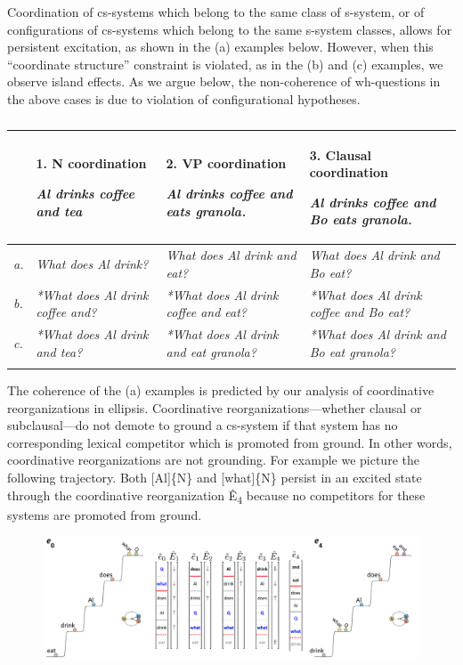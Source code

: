   Coordination of cs-systems which belong to the same class of s-system, or of configurations of cs-systems which belong to the same s-system classes, allows for persistent excitation, as shown in the (a) examples below. However, when this “coordinate structure” constraint is violated, as in the (b) and (c) examples, we observe island effects. As we argue below, the non-coherence of wh-questions in the above cases is due to violation of configurational hypotheses.

\begin{table}
\begin{tabularx}{\textwidth}{lQQQ}
\lsptoprule
& 1. N coordination

\textit{Al drinks coffee and tea} & 2. VP coordination

\textit{Al drinks coffee and eats granola.} & 3. Clausal coordination

\textit{Al drinks coffee and Bo eats granola.}\\
\midrule 

\textit{a.} & \textit{What does Al drink?} & \textit{What does Al drink and eat?} & \textit{What does Al drink and Bo eat?}\\
\textit{b.} & \textit{*What does Al drink coffee and?} & \textit{*What does Al drink coffee and eat?} & \textit{*What does Al drink coffee and Bo eat?}\\
\textit{c.} & \textit{*What does Al drink and tea?} & \textit{*What does Al drink and eat granola?} & \textit{*What does Al drink and Bo eat granola?}\\
\lspbottomrule
\end{tabularx}
\caption{\missingcaption}\label{tab:key:}
\end{table}

The coherence of the (a) examples is predicted by our analysis of coordinative reorganizations in ellipsis. Coordinative reorganizations—whether clausal or subclausal—do not demote to ground a cs-system if that system has no corresponding lexical competitor which is promoted from ground. In other words, coordinative reorganizations are not grounding. For example  we picture the following trajectory. Both [Al]\{N\} and [what]\{N\} persist in an excited state through the coordinative reorganization Ê\textsubscript{4} because no competitors for these systems are promoted from ground.

  
\begin{figure}
\includegraphics[width=\textwidth]{figures/Tilsen-img165.png}
\caption{\missingcaption}
\label{fig:}
\end{figure}
 

